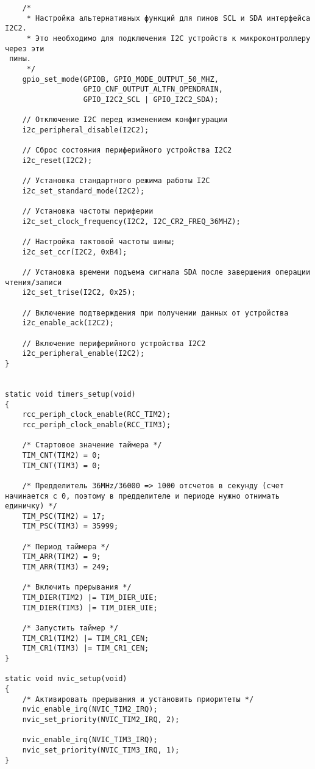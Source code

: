 \begin{code}
\begin{verbatim}
    /*
     * Настройка альтернативных функций для пинов SCL и SDA интерфейса I2C2.
     * Это необходимо для подключения I2C устройств к микроконтроллеру через эти
 пины.
     */
    gpio_set_mode(GPIOB, GPIO_MODE_OUTPUT_50_MHZ,
                  GPIO_CNF_OUTPUT_ALTFN_OPENDRAIN,
                  GPIO_I2C2_SCL | GPIO_I2C2_SDA);
    
    // Отключение I2C перед изменением конфигурации
    i2c_peripheral_disable(I2C2);
    
    // Сброс состояния периферийного устройства I2C2
    i2c_reset(I2C2);
    
    // Установка стандартного режима работы I2C 
    i2c_set_standard_mode(I2C2);
    
    // Установка частоты периферии
    i2c_set_clock_frequency(I2C2, I2C_CR2_FREQ_36MHZ);
    
    // Настройка тактовой частоты шины; 
    i2c_set_ccr(I2C2, 0xB4);
    
    // Установка времени подъема сигнала SDA после завершения операции чтения/записи
    i2c_set_trise(I2C2, 0x25);
    
    // Включение подтверждения при получении данных от устройства
    i2c_enable_ack(I2C2);
    
    // Включение периферийного устройства I2C2
    i2c_peripheral_enable(I2C2);
}


static void timers_setup(void)
{
    rcc_periph_clock_enable(RCC_TIM2);
    rcc_periph_clock_enable(RCC_TIM3);

    /* Стартовое значение таймера */
    TIM_CNT(TIM2) = 0;
    TIM_CNT(TIM3) = 0;

    /* Предделитель 36MHz/36000 => 1000 отсчетов в секунду (счет начинается с 0, поэтому в предделителе и периоде нужно отнимать единичку) */
    TIM_PSC(TIM2) = 17;
    TIM_PSC(TIM3) = 35999;

    /* Период таймера */
    TIM_ARR(TIM2) = 9;
    TIM_ARR(TIM3) = 249;

    /* Включить прерывания */
    TIM_DIER(TIM2) |= TIM_DIER_UIE;
    TIM_DIER(TIM3) |= TIM_DIER_UIE;

    /* Запустить таймер */
    TIM_CR1(TIM2) |= TIM_CR1_CEN;
    TIM_CR1(TIM3) |= TIM_CR1_CEN;
}

static void nvic_setup(void)
{
    /* Активировать прерывания и установить приоритеты */
    nvic_enable_irq(NVIC_TIM2_IRQ);
    nvic_set_priority(NVIC_TIM2_IRQ, 2);

    nvic_enable_irq(NVIC_TIM3_IRQ);
    nvic_set_priority(NVIC_TIM3_IRQ, 1);
}


\end{verbatim}
\end{code}
